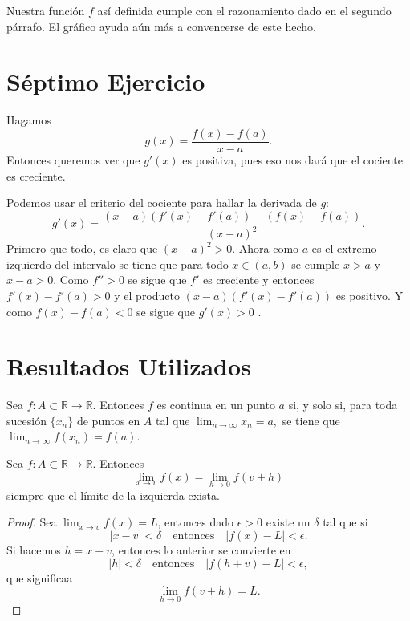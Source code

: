 \documentclass[fleqn,leqno,10pt,letterpaper,final]{article}
\begin{document}
Nuestra función $f$ así definida cumple con el razonamiento dado
en el segundo párrafo. El gráfico ayuda aún más a convencerse de este hecho.

\section{Séptimo Ejercicio}%
Hagamos
\[
	g(x)= \frac{f(x)-f(a)}{x-a} .
\]
Entonces queremos ver que $g'(x)$ es positiva, pues eso nos dará que
el cociente es creciente.

Podemos usar el criterio del cociente para hallar la derivada de $g$:
\[
	g'(x)= \frac{(x-a)(f'(x)-f'(a))-(f(x)-f(a))}{(x-a)^2} .
\]
Primero que todo, es claro que $(x-a)^2>0$. Ahora como $a$ es el extremo izquierdo del intervalo se tiene
que para todo $x\in(a,b)$ se cumple $x>a$ y $x-a>0$. Como $f''>0$ se sigue que $f'$ es creciente y entonces
$f'(x)-f'(a)>0$ y el producto $(x-a)(f'(x)-f'(a))$ es positivo. Y como $f(x)-f(a)<0$ se sigue que $g'(x)>0$
.

\section{Resultados Utilizados}

\begin{cor}\label{cor:contseq}
	Sea $f\colon A\subset\mathbb{R}\to\mathbb{R}$. Entonces $f$ es continua en un punto $a$ si, y solo si,
	para toda sucesión $\{ x_n \}$ de puntos en $A$ tal que  
	$ \lim_{n \to \infty}x_n=a, $
	se tiene que $ \lim_{n \to \infty} f(x_n)=f(a)$.
\end{cor}
\begin{teo}\label{teo:limcambvar}
	Sea $f\colon A\subset\mathbb{R}\to\mathbb{R}$. Entonces
	\[
		\lim_{x\to v} f(x)= \lim_{h\to 0} f(v+h)
	\]
	siempre que el límite de la izquierda exista.
\end{teo}
\begin{proof}
	Sea $ \lim_{x\to v} f(x)=L$, entonces dado $\epsilon>0$ existe un $\delta$ tal que si
	\[
		\left\lvert x-v \right\rvert<\delta\quad\text{entonces}\quad
		\left\lvert f(x)-L \right\rvert<\epsilon.
	\]
	Si hacemos $h=x-v$, entonces lo anterior se convierte en
	\[
		\left\lvert h \right\rvert<\delta\quad\text{entonces}\quad
		\left\lvert f(h+v)-L \right\rvert<\epsilon,
	\]
	que significaa
	\[
	\lim_{h\to 0} f(v+h)=L.
	\]
\end{proof}
\end{document}
